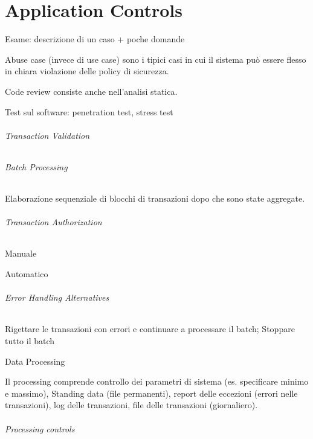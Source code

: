 \part{Application Controls}

Esame: descrizione di un caso + poche domande

Abuse case (invece di use case) sono i tipici casi in cui il sistema può essere 
flesso in chiara violazione delle policy di sicurezza.

Code review consiste anche nell'analisi statica.

Test sul software: penetration test, stress test 

\paragraph{Transaction Validation}

\paragraph{Batch Processing} Elaborazione sequenziale di blocchi di transazioni 
dopo che sono state aggregate. 

\paragraph{Transaction Authorization}
Manuale 

Automatico

\paragraph{Error Handling Alternatives}
Rigettare le transazioni con errori e continuare a processare il batch;
Stoppare tutto il batch



\subparagraph{Data Processing}


Il processing comprende controllo dei parametri di sistema (es. specificare 
minimo e massimo), Standing data (file permanenti), report delle eccezioni 
(errori nelle transazioni), log delle transazioni, file delle transazioni 
(giornaliero).

\paragraph{Processing controls}

